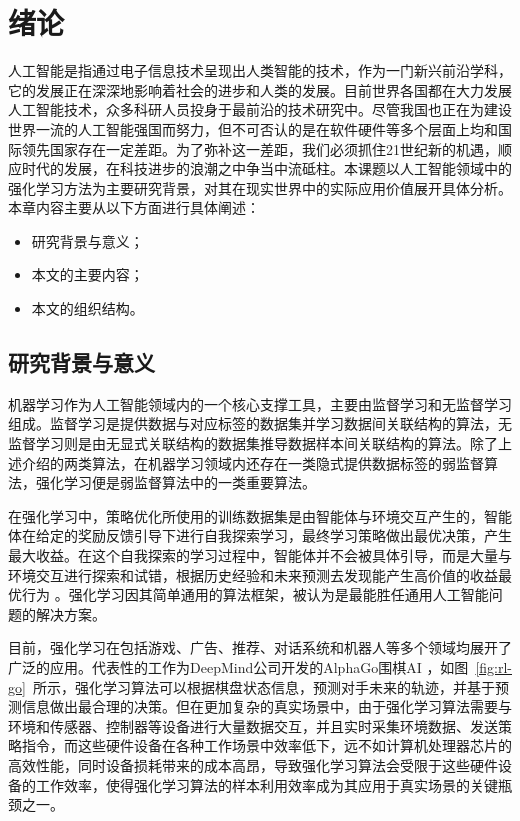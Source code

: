 
\chapter{绪论}\label{chap:intro}

人工智能是指通过电子信息技术呈现出人类智能的技术，作为一门新兴前沿学科，它的发展正在深深地影响着社会的进步和人类的发展。目前世界各国都在大力发展人工智能技术，众多科研人员投身于最前沿的技术研究中。尽管我国也正在为建设世界一流的人工智能强国而努力，但不可否认的是在软件硬件等多个层面上均和国际领先国家存在一定差距。为了弥补这一差距，我们必须抓住21世纪新的机遇，顺应时代的发展，在科技进步的浪潮之中争当中流砥柱。本课题以人工智能领域中的强化学习方法为主要研究背景，对其在现实世界中的实际应用价值展开具体分析。本章内容主要从以下方面进行具体阐述：

\begin{itemize}
    \item 研究背景与意义；
    \item 本文的主要内容；
    \item 本文的组织结构。
\end{itemize}

\section{研究背景与意义}

机器学习作为人工智能领域内的一个核心支撑工具，主要由监督学习和无监督学习组成\cite{sathya2013comparison,goodfellow2016deep}。监督学习是提供数据与对应标签的数据集并学习数据间关联结构的算法，无监督学习则是由无显式关联结构的数据集推导数据样本间关联结构的算法\cite{bishop2006pattern}。除了上述介绍的两类算法，在机器学习领域内还存在一类隐式提供数据标签的弱监督算法\cite{zhou2018brief}，强化学习便是弱监督算法中的一类重要算法。

在强化学习中，策略优化所使用的训练数据集是由智能体与环境交互产生的，智能体在给定的奖励反馈引导下进行自我探索学习，最终学习策略做出最优决策，产生最大收益\cite{tan1993multi}。在这个自我探索的学习过程中，智能体并不会被具体引导，而是大量与环境交互进行探索和试错，根据历史经验和未来预测去发现能产生高价值的收益最优行为 \cite{kaelbling1996reinforcement,sutton2018reinforcement}。强化学习因其简单通用的算法框架，被认为是最能胜任通用人工智能问题的解决方案\cite{shoham2003multi}。 

目前，强化学习在包括游戏、广告、推荐、对话系统和机器人等多个领域均展开了广泛的应用\cite{cai2017real,wang2018reinforcement,li2016deep,riedmiller2009reinforcement}。代表性的工作为DeepMind公司开发的AlphaGo围棋AI \cite{chen2016evolution}，如图~\ref{fig:rl-go}~所示，强化学习算法可以根据棋盘状态信息，预测对手未来的轨迹，并基于预测信息做出最合理的决策\cite{holcomb2018overview}。但在更加复杂的真实场景中，由于强化学习算法需要与环境和传感器、控制器等设备进行大量数据交互，并且实时采集环境数据、发送策略指令，而这些硬件设备在各种工作场景中效率低下，远不如计算机处理器芯片的高效性能，同时设备损耗带来的成本高昂，导致强化学习算法会受限于这些硬件设备的工作效率\cite{zhang2021robust,yao2021sample}，使得强化学习算法的样本利用效率成为其应用于真实场景的关键瓶颈之一\cite{arulkumaran2017deep,kober2013reinforcement}。

